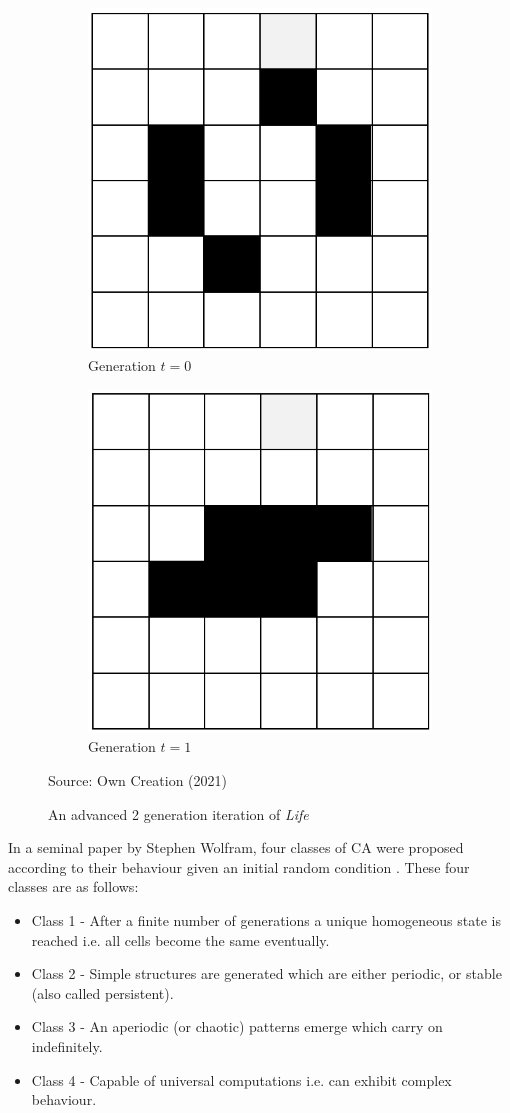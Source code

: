 \begin{figure}[H]
\centering
\begin{subfigure}{.5\textwidth}
  \centering
  \includegraphics[width=.4\linewidth]{Figures/Chapter2/toad1.png}
  \caption{Generation $t = 0$}
\end{subfigure}%
\begin{subfigure}{.5\textwidth}
  \centering
  \includegraphics[width=.4\linewidth]{Figures/Chapter2/toad2.png}
  \caption{Generation $t = 1$}
\end{subfigure}
\caption{An advanced 2 generation iteration of \textsl{Life}}
\begin{center}
Source: Own Creation (2021)
\end{center}
\end{figure}
In a seminal paper by Stephen Wolfram, four classes of CA were proposed according to their behaviour given an initial random condition .\citep{Wolfram1984} These four classes are as follows:
\begin{itemize}
\item Class 1 - After a finite number of generations a unique homogeneous state is reached i.e. all cells become the same eventually.
\item Class 2 - Simple structures are generated which are either periodic, or stable (also called persistent).
\item Class 3 - An aperiodic (or chaotic) patterns emerge which carry on indefinitely.
\item Class 4 - Capable of universal computations i.e. can exhibit complex behaviour. 
\end{itemize}
